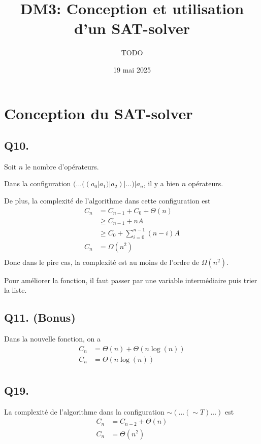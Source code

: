 

\title{DM3: Conception et utilisation d’un SAT-solver}
\author{TODO}
\date{19 mai 2025}



\maketitle
\section{Conception du SAT-solver}
\subsection*{Q10.}
Soit $n$ le nombre d'opérateurs.

Dans la configuration $(...((a_0 | a_1) | a_2) | ...) | a_n$,
il y a bien $n$ opérateurs.

De plus, la complexité de l'algorithme dans cette configuration est
\begin{align*}
    C_n &= C_{n-1} + C_0 + \Theta(n)\\
    &\geq C_{n-1} + nA\\
    &\geq C_0 + \sum_{i=0}^{n-1}(n-i)A\\
    C_n &= \boxed{\Omega(n^2)}\\
\end{align*}
Donc dans le pire cas, la complexité est au moins de l’ordre de $\Omega(n^2)$.

Pour améliorer la fonction, il faut passer par une variable intermédiaire puis
trier la liste.

\subsection*{Q11. (Bonus)}
Dans la nouvelle fonction, on a
\begin{align*}
    C_n &= \Theta(n) + \Theta(n\log(n))\\
    C_n &= \boxed{\Theta(n\log(n))}\\
\end{align*}

\subsection*{Q19.}
La complexité de l’algorithme dans la configuration $\sim(...(\sim T)...)$ est
\begin{align*}
    C_n &= C_{n-2} + \Theta(n)\\
    C_n &= \boxed{\Theta(n^2)}\\
\end{align*}

